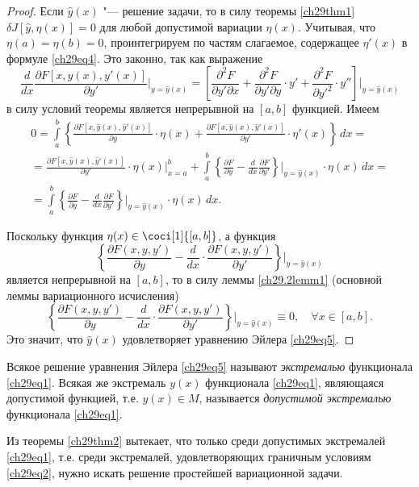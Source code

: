 \begin{proof}
Если $\hat{y}(x)$ "--- решение задачи, то в силу теоремы \ref{ch29thm1} $\delta J[\hat{y},\eta(x)] = 0$ для любой допустимой вариации $\eta(x)$. Учитывая, что $\eta(a)=\eta(b)=0$, проинтегрируем по частям слагаемое, содержащее $\eta'(x)$ в формуле \eqref{ch29eq4}. Это законно, так как выражение
$$
\frac{d}{dx}\frac{\partial F[x,y(x),y'(x)]}{\partial y'}\biggr|_{y=\hat{y}(x)} = \left[\frac{\partial^2F}{\partial y'\partial x}+\frac{\partial^2F}{\partial y'\partial y}\cdot y'+\frac{\partial ^2F}{\partial {y'}^{2}}\cdot y'' \right]\biggr|_{y=\hat{y}(x)}
$$
в силу условий теоремы является непрерывной на $[a,b]$ функцией. Имеем
\begin{multline*}
0=\int\limits_a^b\left\{\frac{\partial F[x,\hat{y}(x),\hat{y}'(x)]}{\partial y}\cdot \eta(x)+\frac{\partial F [x,\hat{y}(x),\hat{y}'(x)]}{\partial y'}\cdot\eta'(x)\right\}\,dx=\\=\frac{\partial F[x,\hat{y}(x),\hat{y}'(x)]}{\partial y'}\cdot \eta(x)\biggr|_{x=a}^{b}+\int\limits_a^b\left\{\frac{\partial F}{\partial y} - \frac{d}{dx}\frac{\partial F}{\partial y'}\right\}\biggr|_{y=\hat{y}(x)}\cdot\eta(x)\,dx=\\=\int\limits_a^b\left\{\frac{\partial F}{\partial y}-\frac{d}{dx}\frac{\partial F}{\partial y'}\right\}\biggr|_{y=\hat{y}(x)}\cdot \eta(x)\,dx.
\end{multline*}

Поскольку функция  $\eta(x)\in\coci[1]{[a,b]}$, а функция
$$
\left\{\frac{\partial F(x,y,y')}{\partial y}-\frac{d}{dx}\cdot\frac{\partial F(x,y,y')}{\partial y'} \right\}\biggr|_{y=\hat{y}(x)}
$$
является непрерывной на $[a,b]$, то в силу леммы  \ref{ch29.2lemm1} (основной леммы вариационного исчисления)
$$
\left\{\frac{\partial F(x,y,y')}{\partial y} - \frac{d}{dx}\cdot\frac{\partial F(x,y,y')}{\partial y'}\right\}\biggr|_{y=\hat{y}(x)}\equiv 0,\quad \forall x\in [a,b].
$$
Это значит, что $\hat{y}(x)$ удовлетворяет уравнению Эйлера \eqref{ch29eq5}.
\end{proof}

\begin{defn}
Всякое решение уравнения Эйлера \eqref{ch29eq5} называют \textit{экстремалью} функционала \eqref{ch29eq1}. Всякая же экстремаль $y(x)$ функционала \eqref{ch29eq1}, являющаяся допустимой функцией, т.е. $y(x)\in M$, называется \textit{допустимой экстремалью} функционала \eqref{ch29eq1}.
\end{defn}

Из теоремы \ref{ch29thm2} вытекает, что только среди допустимых экстремалей \eqref{ch29eq1}, т.е. среди экстремалей, удовлетворяющих граничным условиям \eqref{ch29eq2}, нужно искать решение простейшей вариационной задачи. 

